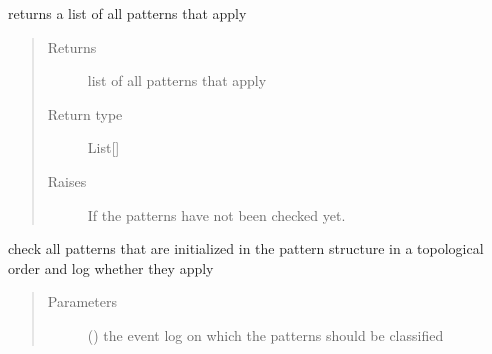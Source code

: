 \documentclass[letterpaper,10pt,english]{sphinxmanual}
\begin{document}
\begin{fulllineitems}
\begin{fulllineitems}
\begin{quote}
\begin{description}
\end{description}\end{quote}

\end{fulllineitems}


\begin{fulllineitems}
\label{\detokenize{event_log_analyzer:event_log_analyzer.pattern_library.pattern_structure.PatternStructure.applying_pattern_list}}
\sphinxAtStartPar
returns a list of all patterns that apply
\begin{quote}\begin{description}
\item[{Returns}] \leavevmode
\sphinxAtStartPar
{} \textendash{} list of all patterns that apply

\item[{Return type}] \leavevmode
\sphinxAtStartPar
List{[}{\hyperref[\detokenize{event_log_analyzer:event_log_analyzer.pattern_library.pattern.Pattern}]{}}{]}

\item[{Raises}] \leavevmode
\sphinxAtStartPar
{} \textendash{} If the patterns have not been checked yet.

\end{description}\end{quote}

\end{fulllineitems}


\begin{fulllineitems}
\label{\detokenize{event_log_analyzer:event_log_analyzer.pattern_library.pattern_structure.PatternStructure.check_all_patterns}}
\sphinxAtStartPar
check all patterns that are initialized in the pattern structure in a topological order and log whether they apply
\begin{quote}\begin{description}
\item[{Parameters}] \leavevmode
\sphinxAtStartPar
{} ({\hyperref[\detokenize{event_log_analyzer:event_log_analyzer.event_log.EventLogStorage}]{}}) \textendash{} the event log on which the patterns should be classified


\end{description}
\end{quote}
\end{fulllineitems}
\end{fulllineitems}
\end{document}
